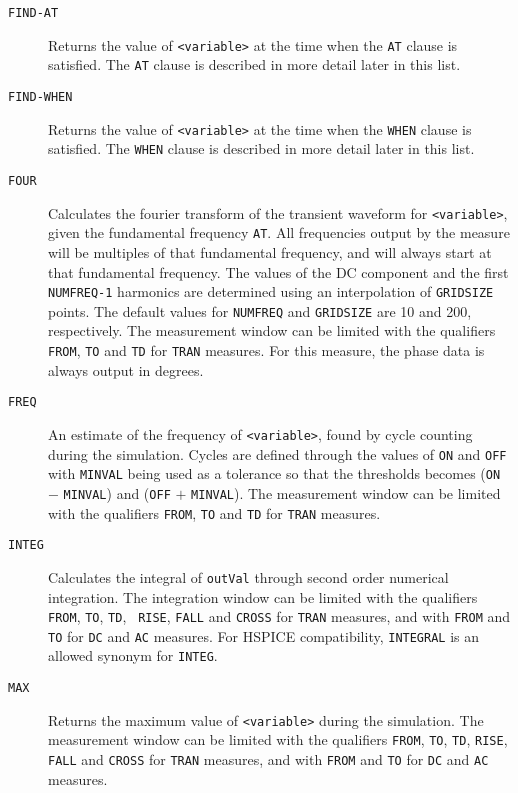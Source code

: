 \begin{Command}
\begin{Arguments}
\begin{description}
  \item[\tt FIND-AT] Returns the value of {\tt <variable>} at the
    time when the {\tt AT} clause is satisfied.  The {\tt AT}
    clause is described in more detail later in this list.

  \item[\tt FIND-WHEN] Returns the value of {\tt <variable>} at the
    time when the {\tt WHEN} clause is satisfied.  The {\tt WHEN}
    clause is described in more detail later in this list.

  \item[\tt FOUR] Calculates the fourier transform of the transient
    waveform for {\tt <variable>}, given the fundamental frequency
    {\tt AT}.  All frequencies output by the measure will be multiples
    of that fundamental frequency, and will always start at that
    fundamental frequency. The values of the DC component and the
    first {\tt NUMFREQ-1} harmonics are determined using an
    interpolation of {\tt GRIDSIZE} points.  The default values for
    {\tt NUMFREQ} and {\tt GRIDSIZE} are 10 and 200, respectively.
    The measurement window can be limited with the qualifiers {\tt
    FROM}, {\tt TO} and {\tt TD} for {\tt TRAN} measures.  For this
    measure, the phase data is always output in degrees.

  \item[\tt FREQ] An estimate of the frequency of {\tt <variable>},
    found by cycle counting during the simulation.  Cycles are defined
    through the values of {\tt ON} and {\tt OFF} with {\tt MINVAL}
    being used as a tolerance so that the thresholds becomes ({\tt ON}
    $-$ {\tt MINVAL}) and ({\tt OFF} $+$ {\tt MINVAL}). The
    measurement window can be limited with the qualifiers {\tt FROM},
    {\tt TO} and {\tt TD} for {\tt TRAN} measures.

  \item[\tt INTEG] Calculates the integral of {\tt outVal} through
    second order numerical integration.  The integration window can be
    limited with the qualifiers {\tt FROM}, {\tt TO}, {\tt TD}, {\tt
    RISE}, {\tt FALL} and {\tt CROSS} for {\tt TRAN} measures, and with
    {\tt FROM} and {\tt TO} for {\tt DC} and {\tt AC} measures.  For
    HSPICE compatibility, {\tt INTEGRAL} is an allowed synonym for
    {\tt INTEG}.

  \item[\tt MAX] Returns the maximum value of {\tt <variable>} during
    the simulation.  The measurement window can be limited with the
    qualifiers {\tt FROM}, {\tt TO}, {\tt TD}, {\tt RISE}, {\tt FALL}
    and {\tt CROSS} for {\tt TRAN} measures, and with {\tt FROM} and
    {\tt TO} for {\tt DC} and {\tt AC} measures.


\end{description}
\end{Arguments}
\end{Command}
